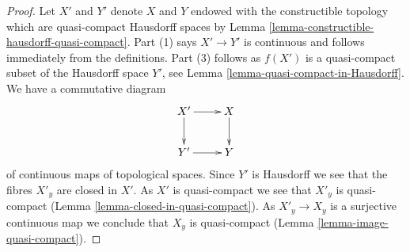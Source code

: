 \documentclass[10pt,a4paper]{amsart}
\theoremstyle{plain}
\theoremstyle{definition}
\theoremstyle{remark}
\numberwithin{equation}{subsection}
\begin{document}
\begin{proof}
Let $X'$ and $Y'$ denote $X$ and $Y$ endowed with the constructible topology
which are quasi-compact Hausdorff spaces by
Lemma \ref{lemma-constructible-hausdorff-quasi-compact}.
Part (1) says $X' \to Y'$ is continuous and follows immediately from the
definitions. Part (3) follows as $f(X')$ is a quasi-compact subset of the
Hausdorff space $Y'$, see Lemma \ref{lemma-quasi-compact-in-Hausdorff}.
We have a commutative diagram
$$
\xymatrix{
X' \ar[r] \ar[d] & X \ar[d] \\
Y' \ar[r] & Y
}
$$
of continuous maps of topological spaces. Since $Y'$ is Hausdorff
we see that the fibres $X'_y$ are closed in $X'$. As $X'$ is quasi-compact
we see that $X'_y$ is quasi-compact
(Lemma \ref{lemma-closed-in-quasi-compact}).
As $X'_y \to X_y$ is a surjective continuous map we conclude
that $X_y$ is quasi-compact (Lemma \ref{lemma-image-quasi-compact}).
\end{proof}
\end{document}
